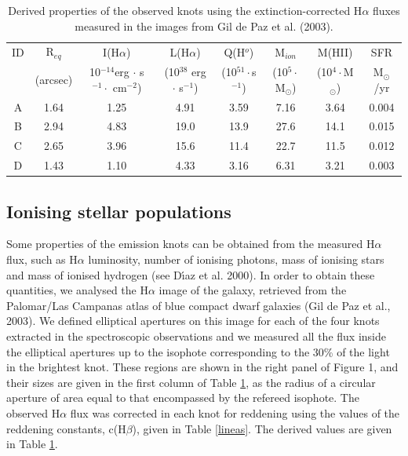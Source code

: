 \documentclass[structabstract]{aa}
\begin{document}
\begin{center}
\begin{table}[t]

\caption{Derived properties of the observed knots using the extinction-corrected H$\alpha$ fluxes 
measured in the images from Gil de Paz et al. (2003). }

\centering
\begin{tabular}{c c c c c c c c}
\hline
\hline
ID & R$_{eq}$ & I(H$\alpha$) & L(H$\alpha$) & Q(H$^o$) & M$_{ion}$ & M(HII)  & SFR \\
  & (arcsec)    & 10$^{-14}$erg $\cdot$ s$^{-1} \cdot$ cm$^{-2}$)  &  (10$^{38}$ erg $\cdot$ s$^{-1}$) &  (10$  ^{51}\cdot$s$^{-1}$) & (10$^5\cdot$M$_{\odot}$)  & (10$^4\cdot$M$_{\odot}$)   &  M$_{\odot}$/yr\\
\hline

A  &  1.64 & 1.25  & 4.91 &   3.59 & 7.16 & 3.64 & 0.004 \\
B  &  2.94 & 4.83  & 19.0 & 13.9   & 27.6 & 14.1 & 0.015 \\
C  &  2.65 & 3.96  & 15.6 & 11.4   & 22.7 & 11.5 & 0.012 \\
D  &  1.43 & 1.10  & 4.33 & 3.16   & 6.31 & 3.21 & 0.003 \\      
\hline
\end{tabular}
\label{prop}
\end{table} 
\end{center}


\subsection{Ionising stellar populations}

Some properties of the emission knots can be obtained from the measured H$\alpha$ flux, such as H$\alpha$ luminosity, number of ionising photons, mass of ionising stars and mass of ionised hydrogen (see D\'\i az et al. 2000). In order to obtain these quantities, we analysed the H$\alpha$ image of the galaxy, retrieved from the
Palomar/Las Campanas atlas of blue compact dwarf galaxies (Gil de Paz et al., 2003). We defined
elliptical apertures on this image for each of the four knots extracted in the spectroscopic observations 
and we measured all the flux inside the elliptical apertures up to the isophote corresponding to the 30\% of
the light in the brightest knot. These regions are shown in the right panel of Figure 1, and their sizes are 
given in the first column of Table \ref{prop}, as the radius of a circular aperture of area equal to that
encompassed by the refereed isophote.
The observed H$\alpha$ flux was corrected in each knot for reddening using the values of the reddening constants,
c(H$\beta$), given in Table \ref{lineas}. The derived values are given in Table \ref{prop}.
\end{document}
